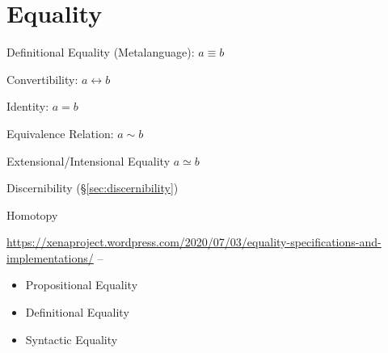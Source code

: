 \section{Equality}\label{sec:equality}\cite{baez15}

Definitional Equality (Metalanguage): $a \equiv b$

Convertibility: $a \leftrightarrow b$

Identity: $a = b$

Equivalence Relation: $a \sim b$

Extensional/Intensional Equality $a \simeq b$

Discernibility (\S\ref{sec:discernibility})

Homotopy

\url{https://xenaproject.wordpress.com/2020/07/03/equality-specifications-and-implementations/}
--
\begin{itemize}
  \item Propositional Equality
  \item Definitional Equality
  \item Syntactic Equality
\end{itemize}



